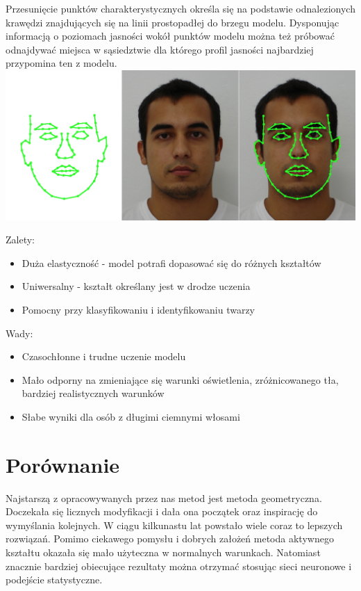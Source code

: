 \documentclass[11pt,a4paper]{article}
\begin{document}
Przesunięcie punktów charakterystycznych określa się na podstawie odnalezionych krawędzi znajdujących się na linii prostopadłej do brzegu modelu. Dysponując informacją o poziomach jasności wokół punktów modelu można też próbować odnajdywać miejsca w sąsiedztwie dla którego profil jasności najbardziej przypomina ten z modelu. \\

\vspace*{1cm}
\includegraphics[scale=0.40]{active_shape.png}
\vspace*{1cm}

\noindent 
Zalety:
\begin{itemize}
\item Duża elastyczność - model potrafi dopasować się do różnych kształtów
\item Uniwersalny - kształt określany jest w drodze uczenia
\item Pomocny przy klasyfikowaniu i identyfikowaniu twarzy
\end{itemize}

\noindent 
Wady:
\begin{itemize}
\item  Czasochłonne i trudne uczenie modelu 
\item  Mało odporny na zmieniające się warunki oświetlenia, zróżnicowanego tła, bardziej realistycznych warunków
\item  Słabe wyniki dla osób z długimi ciemnymi włosami
\end{itemize}

\section{Porównanie}
Najstarszą z opracowywanych przez nas metod jest metoda geometryczna. Doczekała się licznych modyfikacji i dała ona początek oraz inspirację do wymyślania kolejnych. W ciągu kilkunastu lat powstało wiele coraz to lepszych rozwiązań. Pomimo ciekawego pomysłu i dobrych założeń metoda aktywnego kształtu okazała się mało użyteczna w normalnych warunkach. Natomiast znacznie bardziej obiecujące rezultaty można otrzymać stosując sieci neuronowe i podejście statystyczne.
\end{document}
